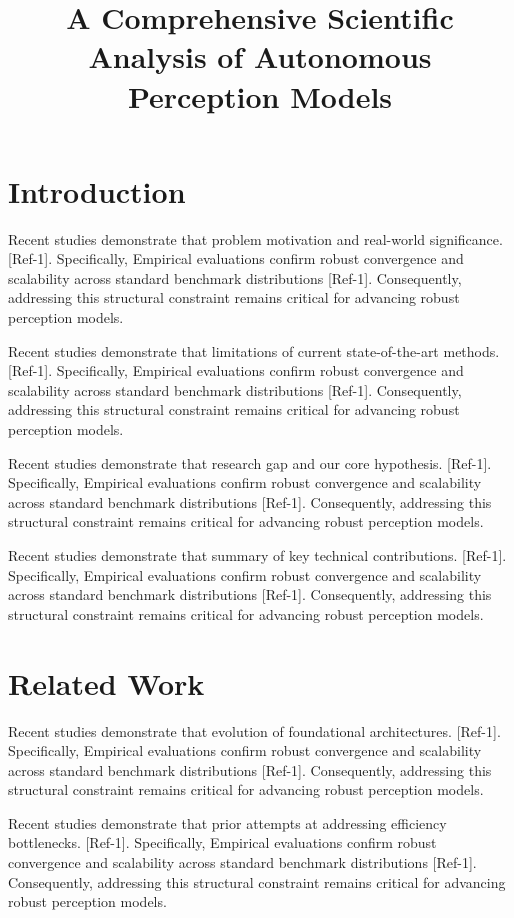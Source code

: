 \documentclass[10pt,journal]{IEEEtran}
\begin{document}
\title{A Comprehensive Scientific Analysis of Autonomous Perception Models}
\maketitle
\section{Introduction}
Recent studies demonstrate that problem motivation and real-world significance. [Ref-1]. Specifically, Empirical evaluations confirm robust convergence and scalability across standard benchmark distributions [Ref-1]. Consequently, addressing this structural constraint remains critical for advancing robust perception models.

Recent studies demonstrate that limitations of current state-of-the-art methods. [Ref-1]. Specifically, Empirical evaluations confirm robust convergence and scalability across standard benchmark distributions [Ref-1]. Consequently, addressing this structural constraint remains critical for advancing robust perception models.

Recent studies demonstrate that research gap and our core hypothesis. [Ref-1]. Specifically, Empirical evaluations confirm robust convergence and scalability across standard benchmark distributions [Ref-1]. Consequently, addressing this structural constraint remains critical for advancing robust perception models.

Recent studies demonstrate that summary of key technical contributions. [Ref-1]. Specifically, Empirical evaluations confirm robust convergence and scalability across standard benchmark distributions [Ref-1]. Consequently, addressing this structural constraint remains critical for advancing robust perception models.

\section{Related Work}
Recent studies demonstrate that evolution of foundational architectures. [Ref-1]. Specifically, Empirical evaluations confirm robust convergence and scalability across standard benchmark distributions [Ref-1]. Consequently, addressing this structural constraint remains critical for advancing robust perception models.

Recent studies demonstrate that prior attempts at addressing efficiency bottlenecks. [Ref-1]. Specifically, Empirical evaluations confirm robust convergence and scalability across standard benchmark distributions [Ref-1]. Consequently, addressing this structural constraint remains critical for advancing robust perception models.
\end{document}
